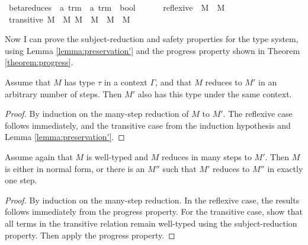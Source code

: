 \begin{implementation}
\isamarkupfalse%
\ beta{\isacharunderscore}reduces\ {\isacharcolon}{\isacharcolon}\ {\isachardoublequoteopen}{\isacharprime}a\ trm\ {\isasymRightarrow}\ {\isacharprime}a\ trm\ {\isasymRightarrow}\ bool{\isachardoublequoteclose}\ {\isacharparenleft}{\isachardoublequoteopen}{\isacharunderscore}\ {\isasymrightarrow}{\isasymbeta}\isactrlsup {\isacharasterisk}\ {\isacharunderscore}{\isachardoublequoteclose}{\isacharparenright}\ \isanewline
\ \ reflexive{\isacharcolon}\ \ {\isachardoublequoteopen}M\ {\isasymrightarrow}{\isasymbeta}\isactrlsup {\isacharasterisk}\ M{\isachardoublequoteclose}\isanewline
{\isacharbar}\ transitive{\isacharcolon}\ {\isachardoublequoteopen}{\isasymlbrakk}M\ {\isasymrightarrow}{\isasymbeta}\isactrlsup {\isacharasterisk}\ M{\isacharprime}{\isacharsemicolon}\ M{\isacharprime}\ {\isasymrightarrow}{\isasymbeta}\ M{\isacharprime}{\isacharprime}{\isasymrbrakk}\ {\isasymLongrightarrow}\ M\ {\isasymrightarrow}{\isasymbeta}\isactrlsup {\isacharasterisk}\ M{\isacharprime}{\isacharprime}{\isachardoublequoteclose}\isanewline
\end{implementation}

Now I can prove the subject-reduction and safety properties for the type system, using Lemma \ref{lemma:preservation'} and the progress property shown in Theorem \ref{theorem:progress}.

\begin{theorem}
Assume that \(M\) has type \(\tau\) in a context \(\Gamma\), and that \(M\) reduces to \(M'\) in an arbitrary number of steps.
Then \(M'\) also has this type under the same context.
\end{theorem}
\begin{proof}
By induction on the many-step reduction of \(M\) to \(M'\).
The reflexive case follows immediately, and the transitive case from the induction hypothesis and Lemma \ref{lemma:preservation'}.
\end{proof}

\begin{theorem}
Assume again that \(M\) is well-typed and \(M\) reduces in many steps to \(M'\).
Then \(M\) is either in normal form, or there is an \(M''\) such that \(M'\) reduces to \(M''\) in exactly one step.
\end{theorem}
\begin{proof}
By induction on the many-step reduction.
In the reflexive case, the results follows immediately from the progress property.
For the transitive case, show that all terms in the transitive relation remain well-typed using the subject-reduction property.
Then apply the progress property.
\end{proof}

